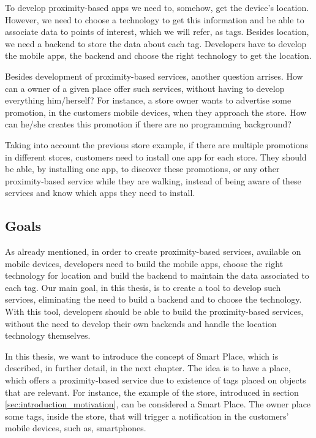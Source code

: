 To develop proximity-based apps we need to, somehow, get the device's location.
However, we need to choose a technology to get this information and be able to associate data to points of interest, which we will refer, as tags.
Besides location, we need a backend to store the data about each tag.
Developers have to develop the mobile apps, the backend and choose the right technology to get the location.

Besides development of proximity-based services, another question arrises.
How can a owner of a given place offer such services, without having to develop everything him/herself?
For instance, a store owner wants to advertise some promotion, in the customers mobile devices, when they approach the store.
How can he/she creates this promotion if there are no programming background?

Taking into account the previous store example, if there are multiple promotions in different stores, customers need to install one app for each store.
They should be able, by installing one app, to discover these promotions, or any other proximity-based service while they are walking, instead of being aware of these services and know which apps they need to install.

\subsection{Goals}
\label{sec:introduction_goals}
As already mentioned, in order to create proximity-based services, available on mobile devices, developers need to build the mobile apps, choose the right technology for location and build the backend to maintain the data associated to each tag.
Our main goal, in this thesis, is to create a tool to develop such services, eliminating the need to build a backend and to choose the technology.
With this tool, developers should be able to build the proximity-based services, without the need to develop their own backends and handle the location technology themselves.

In this thesis, we want to introduce the concept of Smart Place, which is described, in further detail, in the next chapter.
The idea is to have a place, which offers a proximity-based service due to existence of tags placed on objects that are relevant.
For instance, the example of the store, introduced in section \ref{sec:introduction_motivation}, can be considered a Smart Place.
The owner place some tags, inside the store, that will trigger a notification in the customers' mobile devices, such as, smartphones.

